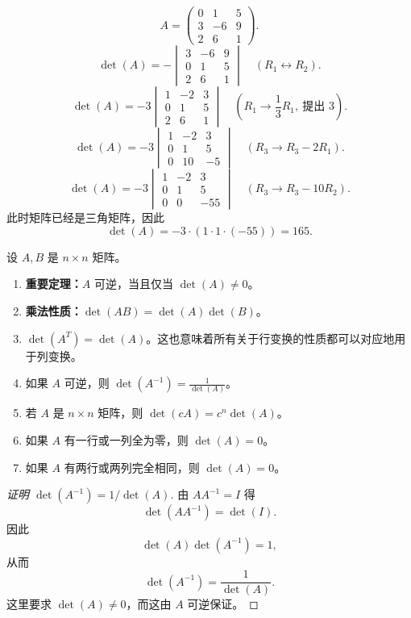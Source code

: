 \begin{example}
\[ A=\begin{pmatrix}0&1&5\\3&-6&9\\2&6&1\end{pmatrix}. \]
\[ \det(A)=-\begin{vmatrix}3&-6&9\\0&1&5\\2&6&1\end{vmatrix}\quad(R_1\leftrightarrow R_2). \]
\[ \det(A)=-3\begin{vmatrix}1&-2&3\\0&1&5\\2&6&1\end{vmatrix}\quad(R_1\to\frac{1}{3}R_1,\ \text{提出 }3). \]
\[ \det(A)=-3\begin{vmatrix}1&-2&3\\0&1&5\\0&10&-5\end{vmatrix}\quad(R_3\to R_3-2R_1). \]
\[ \det(A)=-3\begin{vmatrix}1&-2&3\\0&1&5\\0&0&-55\end{vmatrix}\quad(R_3\to R_3-10R_2). \]
此时矩阵已经是三角矩阵，因此
\[ \det(A)=-3\cdot(1\cdot1\cdot(-55))=165. \]
\end{example}

\begin{property}[行列式的更多性质]
设 $A,B$ 是 $n\times n$ 矩阵。
\begin{enumerate}
    \item \textbf{重要定理：}$A$ 可逆，当且仅当 $\det(A)\neq0$。
    \item \textbf{乘法性质：}$\det(AB)=\det(A)\det(B)$。
    \item $\det(A^T)=\det(A)$。这也意味着所有关于行变换的性质都可以对应地用于列变换。
    \item 如果 $A$ 可逆，则 $\det(A^{-1})=\frac{1}{\det(A)}$。
    \item 若 $A$ 是 $n\times n$ 矩阵，则 $\det(cA)=c^n\det(A)$。
    \item 如果 $A$ 有一行或一列全为零，则 $\det(A)=0$。
    \item 如果 $A$ 有两行或两列完全相同，则 $\det(A)=0$。
\end{enumerate}
\end{property}
\begin{proof}[证明 $\det(A^{-1})=1/\det(A)$]
由 $AA^{-1}=I$ 得
\[
\det(AA^{-1})=\det(I).
\]
因此
\[
\det(A)\det(A^{-1})=1,
\]
从而
\[
\det(A^{-1})=\frac{1}{\det(A)}.
\]
这里要求 $\det(A)\neq0$，而这由 $A$ 可逆保证。
\end{proof}

